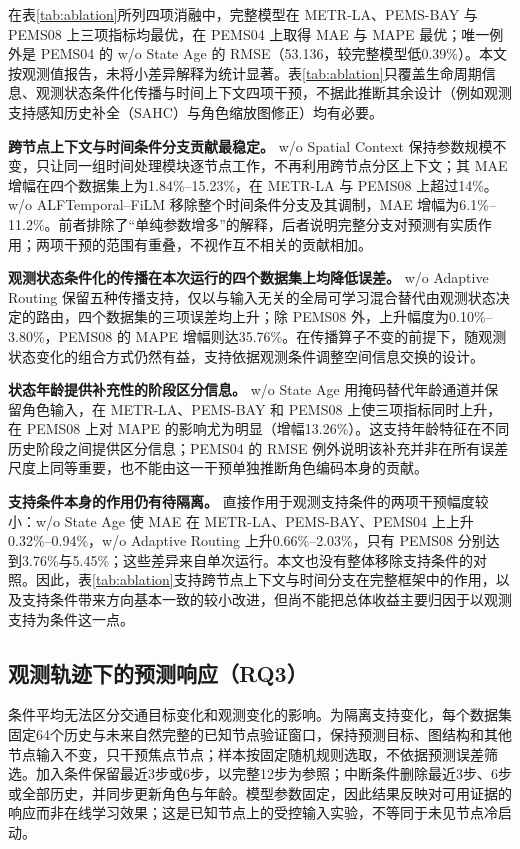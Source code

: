 在表\ref{tab:ablation}所列四项消融中，完整模型在 METR-LA、PEMS-BAY 与 PEMS08 上三项指标均最优，在 PEMS04 上取得 MAE 与 MAPE 最优；唯一例外是 PEMS04 的 w/o State Age 的 RMSE（53.136，较完整模型低0.39\%）。本文按观测值报告，未将小差异解释为统计显著。表\ref{tab:ablation}只覆盖生命周期信息、观测状态条件化传播与时间上下文四项干预，不据此推断其余设计（例如观测支持感知历史补全（SAHC）与角色缩放图修正）均有必要。

\textbf{跨节点上下文与时间条件分支贡献最稳定。} w/o Spatial Context 保持参数规模不变，只让同一组时间处理模块逐节点工作，不再利用跨节点分区上下文；其 MAE 增幅在四个数据集上为1.84\%–15.23\%，在 METR-LA 与 PEMS08 上超过14\%。w/o ALFTemporal–FiLM 移除整个时间条件分支及其调制，MAE 增幅为6.1\%–11.2\%。前者排除了“单纯参数增多”的解释，后者说明完整分支对预测有实质作用；两项干预的范围有重叠，不视作互不相关的贡献相加。

\textbf{观测状态条件化的传播在本次运行的四个数据集上均降低误差。} w/o Adaptive Routing 保留五种传播支持，仅以与输入无关的全局可学习混合替代由观测状态决定的路由，四个数据集的三项误差均上升；除 PEMS08 外，上升幅度为0.10\%–3.80\%，PEMS08 的 MAPE 增幅则达35.76\%。在传播算子不变的前提下，随观测状态变化的组合方式仍然有益，支持依据观测条件调整空间信息交换的设计。

\textbf{状态年龄提供补充性的阶段区分信息。} w/o State Age 用掩码替代年龄通道并保留角色输入，在 METR-LA、PEMS-BAY 和 PEMS08 上使三项指标同时上升，在 PEMS08 上对 MAPE 的影响尤为明显（增幅13.26\%）。这支持年龄特征在不同历史阶段之间提供区分信息；PEMS04 的 RMSE 例外说明该补充并非在所有误差尺度上同等重要，也不能由这一干预单独推断角色编码本身的贡献。

\textbf{支持条件本身的作用仍有待隔离。} 直接作用于观测支持条件的两项干预幅度较小：w/o State Age 使 MAE 在 METR-LA、PEMS-BAY、PEMS04 上上升0.32\%–0.94\%，w/o Adaptive Routing 上升0.66\%–2.03\%，只有 PEMS08 分别达到3.76\%与5.45\%；这些差异来自单次运行。本文也没有整体移除支持条件的对照。因此，表\ref{tab:ablation}支持跨节点上下文与时间分支在完整框架中的作用，以及支持条件带来方向基本一致的较小改进，但尚不能把总体收益主要归因于以观测支持为条件这一点。

\subsection{观测轨迹下的预测响应（RQ3）}\label{sec:4_5}

条件平均无法区分交通目标变化和观测变化的影响。为隔离支持变化，每个数据集固定64个历史与未来自然完整的已知节点验证窗口，保持预测目标、图结构和其他节点输入不变，只干预焦点节点；样本按固定随机规则选取，不依据预测误差筛选。加入条件保留最近3步或6步，以完整12步为参照；中断条件删除最近3步、6步或全部历史，并同步更新角色与年龄。模型参数固定，因此结果反映对可用证据的响应而非在线学习效果；这是已知节点上的受控输入实验，不等同于未见节点冷启动。

